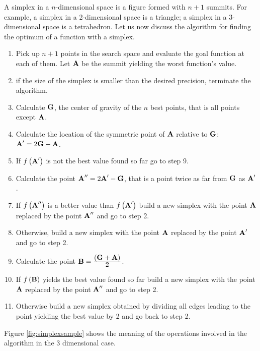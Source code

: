 A simplex in a $n$-dimensional space is a figure formed with $n+1$
summits. For example, a simplex in a 2-dimensional space is a
triangle; a simplex in a 3-dimensional space is a tetrahedron.
Let us now discuss the algorithm for finding the optimum of a
function with a simplex.
\begin{enumerate}
  \item Pick up $n+1$ points in the search space and evaluate
  the goal function at each of them. Let ${\textbf A}$ be the summit
  yielding the worst function's value.
  \item if the size of the simplex is smaller than the desired
  precision, terminate the algorithm.
  \item Calculate ${\textbf G}$, the center of gravity of the $n$ best points,
  that is all points except ${\textbf A}$.
  \item Calculate the location of the symmetric point of ${\textbf A}$
  relative to ${\textbf G}$: ${\textbf A}^{\prime}=2{\textbf G}-{\textbf A}$.
  \item If $f\left({\textbf A}^{\prime}\right)$ is not the best value
  found so far go to step 9.
  \item Calculate the point ${\textbf A}^{\prime\prime}=2{\textbf A}^{\prime}-{\textbf
  G}$, that is a point twice as far from ${\textbf G}$ as ${\textbf
  A}^{\prime}$.
  \item If $f\left({\textbf A}^{\prime\prime}\right)$ is a
  better value than $f\left({\textbf A}^{\prime}\right)$ build a new
  simplex with the point ${\textbf A}$ replaced by the point ${\textbf
  A}^{\prime\prime}$ and go to step 2.
  \item Otherwise, build a new
  simplex with the point ${\textbf A}$ replaced by the point ${\textbf
  A}^{\prime}$ and go to step 2.
  \item Calculate the point ${\textbf B}= {\displaystyle\left({\textbf G}+{\textbf
A}\right)\over\displaystyle 2}$.
  \item If $f\left({\textbf B}\right)$ yields the best value found so far
  build a new simplex with the point ${\textbf A}$ replaced by the point ${\textbf
  A}^{\prime\prime}$ and go to step 2.
  \item Otherwise build a new simplex obtained by dividing all
  edges leading to the point yielding the best value by 2 and go
  back to step 2.
\end{enumerate}
Figure \ref{fig:simplexsample} shows the meaning of the operations
involved in the algorithm in the 3 dimensional case.
